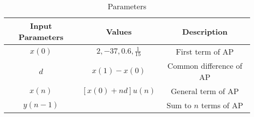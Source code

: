 \begin{table}[htbp]
    \centering
    \begin{tabular}{|c|c|c|} \hline
      \textbf{Input Parameters} & \textbf{Values} & \textbf{Description} \\ \hline
      $x(0)$ & $2, -37, 0.6, \frac{1}{15}$ & First term of AP \\ \hline
      $d$ & $x(1)-x(0)$ & Common difference of AP \\ \hline
      $x(n)$ & $[x(0)+nd]u(n)$ & General term of AP \\ \hline
      $y(n-1)$ & & Sum to $n$ terms of AP \\ \hline
    \end{tabular}
    \vspace{3pt}
    \caption{Parameters}
    \label{tab:10.5.3.1}
\end{table}
